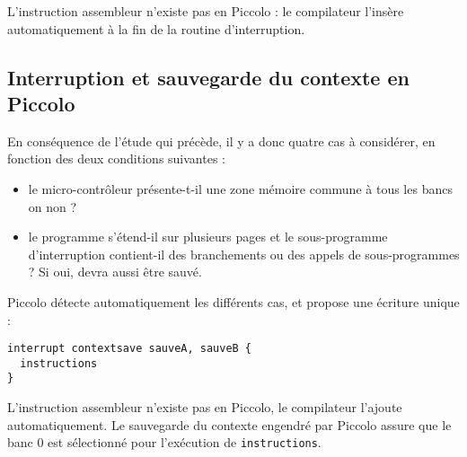 L’instruction assembleur  n’existe pas en Piccolo : le compilateur l’insère automatiquement à la fin de la routine d’interruption.

\subsection{Interruption et sauvegarde du contexte en Piccolo}

En conséquence de l'étude qui précède, il y a donc quatre cas à considérer, en fonction des deux conditions suivantes :
\begin{itemize}
  \item le micro-contrôleur présente-t-il une zone mémoire commune à tous les bancs on non ?
  \item le programme s’étend-il sur plusieurs pages et le sous-programme d’interruption contient-il des branchements ou des appels de sous-programmes ? Si oui,  devra aussi être sauvé.
\end{itemize}


Piccolo détecte automatiquement les différents cas, et propose une écriture unique :
\begin{lstlisting}[language=piccolo]
interrupt contextsave sauveA, sauveB {
  instructions
}
\end{lstlisting}

L'instruction assembleur  n'existe pas en Piccolo, le compilateur l'ajoute automatiquement. Le sauvegarde du contexte engendré par Piccolo assure que le banc 0 est sélectionné pour l'exécution de \texttt{instructions}.

